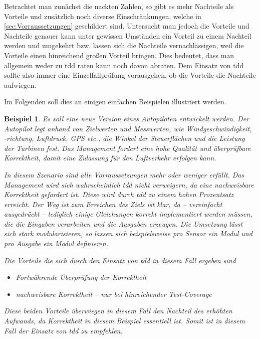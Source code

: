 \documentclass[a4paper,10pt]{scrartcl}
\newtheorem{beispiel}{Beispiel}[section]
\begin{document}
Betrachtet man zunächst die nackten Zahlen, so gibt es mehr Nachteile als 
Vorteile und zusätzlich noch diverse Einschränkungen, welche in \autoref{sec:Vorraussetzungen}
geschildert sind. Untersucht man jedoch die Vorteile und Nachteile genauer
kann unter gewissen Umständen ein Vorteil zu einem Nachteil werden und
umgekehrt bzw. lassen sich die Nachteile vernachlässigen, weil die Vorteile
einen hinreichend großen Vorteil bringen. Dies bedeutet, dass man allgemein 
weder zu \gls{tdd} raten kann noch davon abraten. Dem Einsatz von \gls{tdd}
sollte also immer eine Einzelfallprüfung vorausgehen, ob die Vorteile die
Nachteile aufwiegen.

Im Folgenden soll dies an einigen einfachen Beispielen illustriert werden.

\begin{beispiel}
  \textit{Es soll eine neue Version eines Autopiloten entwickelt werden. Der Autopilot 
  legt anhand von Zielwerten und Messwerten, wie Windgeschwindigkeit, -richtung, Luftdruck,
  GPS etc., die Winkel der Steuerflächen und die Leistung der Turbinen fest. Das 
  Management fordert eine hohe Qualität und überprüfbare Korrektheit, damit eine 
  Zulassung für den Luftverkehr erfolgen kann.}
  
  In diesem Szenario sind alle Vorraussetzungen mehr oder weniger erfüllt. Das
  Management wird sich wahrscheinlich \gls{tdd} nicht verweigern, da eine
  nachweisbare Korrektheit gefordert ist. Diese wird durch \gls{tdd} zu einem
  hohen Prozentsatz erreicht. Der Weg ist zum Erreichen des Ziels ist klar, da
  -- vereinfacht ausgedrückt -- lediglich einige Gleichungen korrekt implementiert 
  werden müssen, die die Eingaben verarbeiten und die Ausgaben erzeugen. Die Umsetzung
  lässt sich stark modularisieren, so lassen sich beispielsweise pro Sensor ein Modul
  und pro Ausgabe ein Modul definieren.
  
  Die Vorteile die sich durch den Einsatz von \gls{tdd} in diesem Fall ergeben sind
  \begin{itemize}
    \item Fortwährende Überprüfung der Korrektheit
    \item nachweisbare Korrektheit -- nur bei hinreichender Test-Coverage
  \end{itemize}
  
  Diese beiden Vorteile überwiegen in diesem Fall den Nachteil des erhöhten Aufwands,
  da Korrektheit in diesem Beispiel essentiell ist. Somit ist in diesem Fall der
  Einsatz von \gls{tdd} zu empfehlen.
\end{beispiel}
\end{document}
